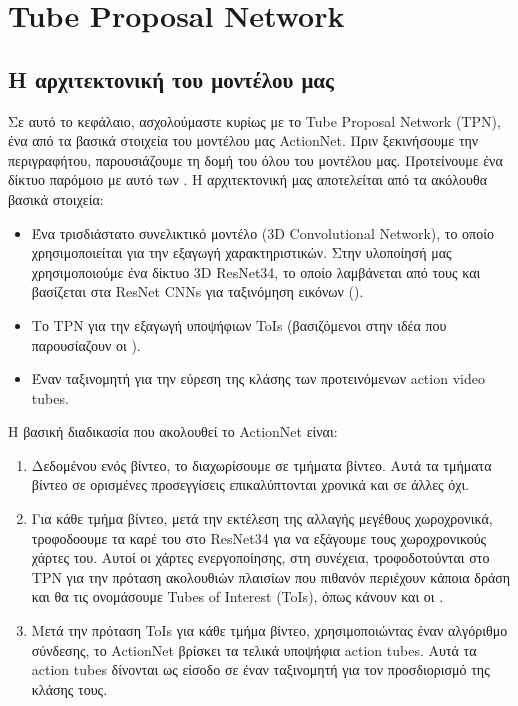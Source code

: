 \documentclass{report}
\begin{document}
 
\chapter{Tube Proposal Network}
\section{ Η αρχιτεκτονική του μοντέλου μας}
Σε αυτό το κεφάλαιο, ασχολούμαστε κυρίως με  το Tube Proposal Network (TPN), ένα από τα βασικά στοιχεία του μοντέλου μας ActionNet. Πριν ξεκινήσουμε την
περιγραφήτου, παρουσιάζουμε τη δομή του όλου του μοντέλου μας. Προτείνουμε ένα δίκτυο παρόμοιο με αυτό των \cite{DBLP:journals/corr/HouCS17}.
Η αρχιτεκτονική μας αποτελείται από τα ακόλουθα βασικά στοιχεία:
\begin{itemize}
\item Ένα τρισδιάστατο συνελικτικό μοντέλο (3D Convolutional Network), το οποίο χρησιμοποιείται για την εξαγωγή χαρακτηριστικών.
  Στην υλοποίησή μας χρησιμοποιούμε ένα δίκτυο 3D ResNet34, το οποίο λαμβάνεται από τους \cite{hara3dcnns}  και βασίζεται
  στα ResNet CNNs για  ταξινόμηση εικόνων (\cite{DBLP:journals/corr/HeZRS15}).
\item Το TPN για την εξαγωγή υποψήφιων ToIs (βασιζόμενοι στην ιδέα που παρουσίαζουν οι  \cite{DBLP:journals/corr/HouCS17} ).
\item Έναν ταξινομητή για την εύρεση της κλάσης των προτεινόμενων action video tubes.
\end{itemize}

Η βασική διαδικασία που ακολουθεί το ActionNet είναι:
\begin{enumerate}
\item Δεδομένου ενός βίντεο, το διαχωρίσουμε σε τμήματα βίντεο. Αυτά τα τμήματα βίντεο  σε ορισμένες προσεγγίσεις επικαλύπτονται χρονικά και σε άλλες όχι.
\item Για κάθε τμήμα βίντεο, μετά την εκτέλεση της αλλαγής μεγέθους χωροχρονικά, τροφοδοουμε τα καρέ του στο ResNet34 για να εξάγουμε τους χωροχρονικούς
  χάρτες του. Αυτοί οι χάρτες ενεργοποίησης, στη συνέχεια, τροφοδοτούνται στο TPN για την πρόταση ακολουθιών πλαισίων που πιθανόν περιέχουν κάποια δράση και
  θα τις ονομάσουμε Tubes of Interest (ToIs), όπως κάνουν και οι  \cite{DBLP:journals/corr/HouCS17} .
\item Μετά την πρόταση ToIs για κάθε τμήμα βίντεο, χρησιμοποιώντας έναν αλγόριθμο σύνδεσης, το ActionNet βρίσκει τα τελικά υποψήφια action tubes.
 Αυτά τα action tubes δίνονται ως είσοδο σε έναν ταξινομητή για τον προσδιορισμό της κλάσης τους.
\end{enumerate}
\end{document}
